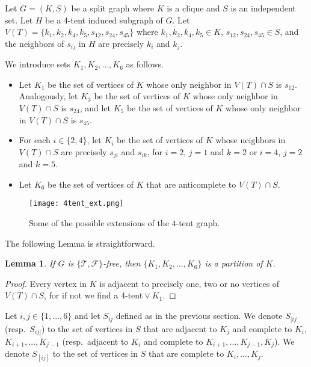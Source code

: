\documentclass[12pt]{book}
\theoremstyle{plain}
\newtheorem{lema}[teo]{Lemma}
\theoremstyle{remark}
\begin{document}
Let $G=(K,S)$ be a split graph where $K$ is a clique and $S$ is an independent set. Let $H$ be a $4$-tent induced subgraph of $G$. Let $V(T)=\{k_1,k_2,k_4,k_5,s_{12},s_{24},s_{45}\}$ where $k_1,k_2,k_4,k_5\in K$, $s_{12},s_{24},s_{45}\in S$, and the neighbors of $s_{ij}$ in $H$ are precisely $k_i$ and $k_j$.

We introduce sets $K_1,K_2,\ldots,K_6$ as follows.
\begin{itemize}
 \item Let $K_1$ be the set of vertices of $K$ whose only neighbor in $V(T)\cap S$ is $s_{12}$.
 Analogously, let $K_3$ be the set of vertices of $K$ whose only neighbor in $V(T)\cap S$ is $s_{24}$, and let $K_5$ be the set of vertices of $K$ whose only neighbor in $V(T)\cap S$ is $s_{45}$.
 \item For each $i\in \{2, 4\}$, let $K_i$ be the set of vertices of $K$ whose neighbors in $V(T)\cap S$ are precisely $s_{ji}$ and $s_{ik}$, for $i=2$, $j=1$ and $k=2$ or $i=4$, $j=2$ and $k=5$.
 
 \item Let $K_6$ be the set of vertices of $K$ that are anticomplete to $V(T)\cap S$.
\end{itemize}


\begin{figure}[h!]
\centering
    \texttt{[image: 4tent\_ext.png]}
  \caption{Some of the possible extensions of the $4$-tent graph.}		
  \label{fig:4tent_ext}    
\end{figure}


The following Lemma is straightforward.

\begin{lema}\label{lema:4tent_0}
	If $G$ is $\{ \mathcal{T}, \mathcal{F} \}$-free, then $\{K_1, K_2, \ldots, K_6\}$ is a partition of $K$.
\end{lema}

\begin{proof}
Every vertex in $K$ is adjacent to precisely one, two or no vertices of $V(T)\cap S$, for if not we find a $4$-tent${}\vee{}K_1$. %
\end{proof}

Let $i,j \in \{1, \ldots, 6\}$ and let $S_{ij}$ defined as in the previous section. We denote $S_{[ij}$ (resp.\ $S_{ij]}$) to the set of vertices in $S$ that are adjacent to $K_j$ and complete to $K_i$, $K_{i+1}, \ldots, K_{j-1}$ (resp.\ adjacent to $K_i$ and complete to $K_{i+1}, \ldots, K_{j-1}, K_j$). %
We denote $S_{[ij]}$ to the set of vertices in $S$ that are complete to $K_i, \ldots, K_j$.
\end{document}
